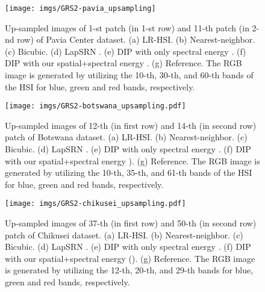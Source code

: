 \documentclass[journal]{IEEEtran}
\begin{document}
    \begin{figure}[tb]
        \centering
        \texttt{[image: imgs/GRS2-pavia\_upsampling]}
        \caption{Up-sampled images of 1-st patch (in 1-st row) and 11-th patch (in 2-nd row) of Pavia Center dataset. (a) LR-HSI. (b) Nearest-neighbor. (c) Bicubic. (d) LapSRN \cite{LapSRN}. (e) DIP with only spectral energy \cite{DHP-DARN}. (f) DIP with our spatial+spectral energy . (g) Reference. The RGB image is generated by utilizing the 10-th, 30-th, and 60-th bands of the HSI for blue, green and red bands, respectively.}
        \label{fig:pavia_upsampling_comp}
    \end{figure}
    
    \begin{figure}[tb]
        \centering
        \texttt{[image: imgs/GRS2-botswana\_upsampling.pdf]}
        \caption{Up-sampled images of 12-th (in first row) and 14-th (in second row)  patch of Botswana dataset. (a) LR-HSI. (b) Nearest-neighbor. (c) Bicubic. (d) LapSRN \cite{LapSRN}. (e) DIP with only spectral energy \cite{DHP-DARN}. (f) DIP with our spatial+spectral energy ). (g) Reference. The RGB image is generated by utilizing the 10-th, 35-th, and 61-th bands of the HSI for blue, green and red bands, respectively.}
        \label{fig:botswana_upsampling_comp}
    \end{figure}
    
    \begin{figure}[tb]
        \centering
        \texttt{[image: imgs/GRS2-chikusei\_upsampling.pdf]}
        \caption{Up-sampled images of 37-th (in first row) and 50-th (in second row)  patch of Chikusei dataset. (a) LR-HSI. (b) Nearest-neighbor. (c) Bicubic. (d) LapSRN \cite{LapSRN}. (e) DIP with only spectral energy \cite{DHP-DARN}. (f) DIP with our spatial+spectral energy  (). (g) Reference. The  RGB image is generated by utilizing the 12-th, 20-th, and 29-th bands for blue, green and red bands, respectively.}
        \label{fig:chikusei_upsample_comp}
    \end{figure}
    
\end{document}
